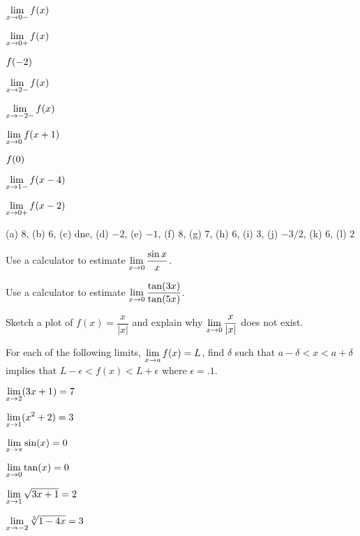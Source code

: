 \begin{exercises}
\begin{exercise}
\begin{enumerate}
\begin{multicols}{3}
\item $\displaystyle \lim_{x\to 0-} f(x)$  
\item $\displaystyle \lim_{x\to 0+} f(x)$  
\item $\displaystyle f(-2)$  
\item $\displaystyle \lim_{x\to 2-} f(x)$  
\item $\displaystyle \lim_{x\to -2-} f(x)$  
\item $\displaystyle \lim_{x\to 0} f(x+1)$  
\item $\displaystyle f(0)$ 
\item $\displaystyle \lim_{x\to 1-} f(x-4)$  
\item $\displaystyle \lim_{x\to 0+} f(x-2)$
\end{multicols}  
\end{enumerate}
\begin{answer} (a) $8$, (b) $6$, (c) dne, (d) $-2$, (e) $-1$, (f) $8$,
 (g) $7$, (h) $6$, (i) $3$, (j) $-3/2$, (k) $6$, (l) $2$
\end{answer}
\end{exercise}


\begin{exercise} 
Use a calculator to estimate $\displaystyle\lim_{x\to 0} {\sin x\over x}$.
\end{exercise}

\begin{exercise} 
Use a calculator to estimate $\displaystyle\lim_{x\to 0}\frac{\tan(3x)}{\tan(5x)}$.
\end{exercise}


\begin{exercise} 
Sketch a plot of $f(x) = \dfrac{x}{|x|}$ and explain why $\displaystyle
\lim_{x\to 0} \frac{x}{|x|}$ does not exist.
\end{exercise}


\begin{exercise} 
For each of the following limits, $\displaystyle \lim_{x\to a} f(x) =L$, find
$\delta$ such that $a -\delta < x < a+\delta$ implies that $L -
\epsilon< f(x) < L+\epsilon$ where $\epsilon = .1$.
\begin{enumerate}
\begin{multicols}{3}
\item $\displaystyle \lim_{x\to 2}(3x+1) = 7$  
\item $\displaystyle \lim_{x\to 1} (x^2+2) = 3$  
\item $\displaystyle \lim_{x\to \pi} \sin(x) = 0$  
\item $\displaystyle \lim_{x\to 0} \tan(x) = 0$
\item $\displaystyle \lim_{x\to 1} \sqrt{3x+1} = 2$
\item $\displaystyle \lim_{x\to -2} \sqrt[3]{1-4x} = 3$
\end{multicols}  
\end{enumerate}
\end{exercise}


\end{exercises}
